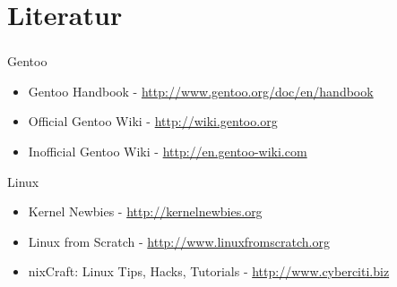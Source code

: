\documentclass[utf8]{beamer}
\begin{document}
\section{Literatur}

\begin{frame}
  \frametitle{\insertsectionhead}
  \framesubtitle{}

  \begin{block}{Gentoo}
    \begin{itemize}
      \item Gentoo Handbook - \url{http://www.gentoo.org/doc/en/handbook}
      \item Official Gentoo Wiki - \url{http://wiki.gentoo.org}
      \item Inofficial Gentoo Wiki - \url{http://en.gentoo-wiki.com}
    \end{itemize}
  \end{block}
  \begin{block}{Linux}
    \begin{itemize}
      \item Kernel Newbies - \url{http://kernelnewbies.org}
      \item Linux from Scratch - \url{http://www.linuxfromscratch.org}
      \item nixCraft: Linux Tips, Hacks, Tutorials - \url{http://www.cyberciti.biz}
    \end{itemize}
  \end{block}
\end{frame}
\end{document}
